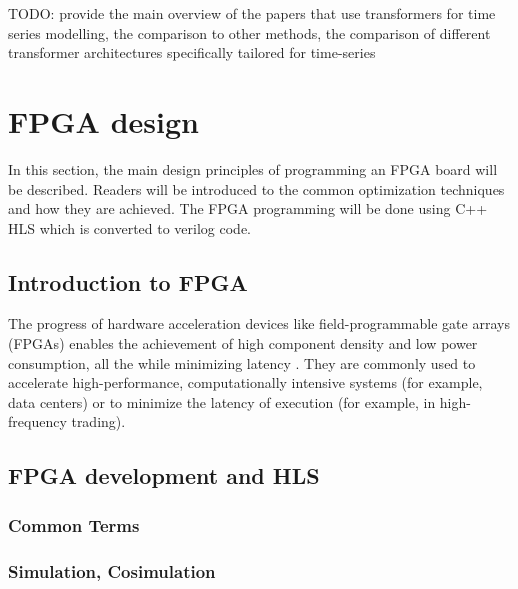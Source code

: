 \documentclass[a4paper, twoside]{report}
\theoremstyle{definition}
\numberwithin{equation}{section}
\begin{document}
TODO: provide the main overview of the papers that use transformers for time series modelling,
the comparison to other methods, the comparison of different transformer architectures specifically
tailored for time-series


\section{FPGA design}


In this section, the main design principles of programming an FPGA board will be described. Readers will be introduced to the common optimization techniques and how they are achieved. The FPGA programming will be done using C++ HLS which is converted to verilog code.

\subsection{Introduction to FPGA}


The progress of hardware acceleration devices like field-programmable gate arrays (FPGAs) enables the achievement of high component density and low power consumption, all the while minimizing latency \cite{10.1007/978-3-319-56258-2_14}. They are commonly used to accelerate high-performance, computationally intensive systems (for example, data centers) or to minimize the latency of execution (for example, in high-frequency trading).

\subsection{FPGA development and HLS}

\subsubsection{Common Terms}



\subsubsection{Simulation, Cosimulation}
\end{document}
